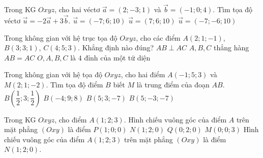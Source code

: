 \begin{ex}%
	Trong KG $Oxyz$, cho hai véctơ $\overrightarrow{a}=(2;-3;1)$ và $\overrightarrow{b}=(-1;0;4)$. Tìm tọa độ véctơ $\overrightarrow{u}=-2\overrightarrow{a}+3\overrightarrow{b}$.
	{\True $\overrightarrow{u}=(-7;6;10)$}
	{$\overrightarrow{u}=(7;6;10)$}
	{$\overrightarrow{u}=(-7;-6;10)$}
\end{ex}
\begin{ex}%
	Trong không gian với hệ trục tọa độ $Oxyz$, cho các điểm $A\left(2; 1; -1\right)$, $B\left(3; 3; 1\right)$, $C\left(4; 5; 3\right)$. Khẳng định nào đúng?
	\choice
	{$AB\perp AC$}
	{\True $A, B, C$ thẳng hàng}
	{$AB = AC$}
	{$O, A, B, C$ là $4$ đỉnh của một tứ diện}
\end{ex}
\begin{ex}%
	Trong không gian với hệ tọa độ $ Oxyz $, cho hai điểm $ A(-1;5;3) $ và $ M(2;1;-2) $. Tìm tọa độ điểm $ B $ biết $ M $ là trung điểm của đoạn $ AB $.
	\choice
	{$ B\left(\dfrac{1}{2};3;\dfrac{1}{2}\right) $}
	{$ B(-4;9;8) $}
	{$ B(5;3;-7) $}
	{\True $ B(5;-3;-7) $}
\end{ex}
\begin{ex}%
	Trong KG $Oxyz$, cho điểm $A(1;2;3)$. Hình chiếu vuông góc của điểm $A$ trên mặt phẳng $(Oxy)$ là điểm
	\choice
	{$P(1;0;0)$}
	{\True $N(1;2;0)$}
	{$Q(0;2;0)$}
	{$M(0;0;3)$}
	\loigiai
	{
		Hình chiếu vuông góc của điểm $A(1;2;3)$ trên mặt phẳng $(Oxy)$ là điểm $N(1;2;0)$.
	}
\end{ex}

